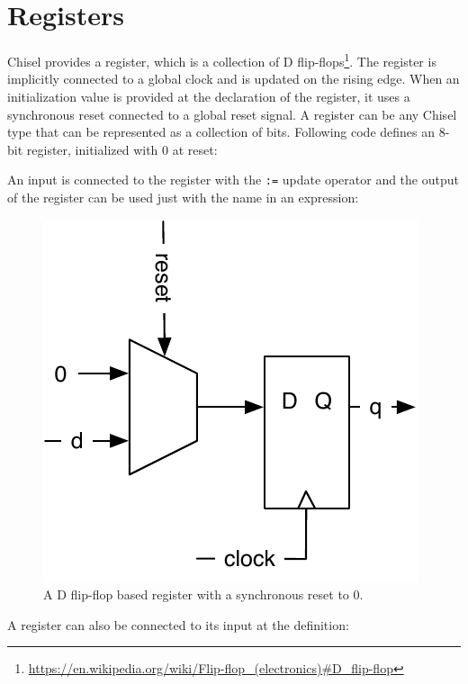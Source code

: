 \documentclass[%
    10pt,
    headinclude, footexclude,
    openright, %
    notitlepage,
    cleardoubleempty,
    headsepline,
    pointlessnumbers,
    bibtotoc, idxtotoc,
    ]{scrbook}
\newcommand{\code}[1]{{\small{\texttt{#1}}}}
\newcommand{\scale}{0.7}
\newcommand{\myref}[2]{\href{#1}{#2}}
\renewcommand{\myref}[2]{{#2}{\footnote{\url{#1}}}}
\begin{document}
\section{Registers}


Chisel provides a register, which is a collection of
\myref{https://en.wikipedia.org/wiki/Flip-flop\_(electronics)\#D\_flip-flop}{D flip-flops}.
The register is implicitly connected to a global clock and is updated on the rising edge.
When an initialization value is provided at the declaration of the register,
it uses a synchronous reset connected to a global reset signal.
A register can be any Chisel type that can be represented as a collection of bits.
Following code defines an 8-bit register, initialized with 0 at reset:


\noindent An input is connected to the register with the \code{:=} update operator and
the output of the register can be used just with the name in an expression:


\begin{figure}
  \centering
  \includegraphics[scale=\scale]{figures/register-reset-0}
  \caption{A D flip-flop based register with a synchronous reset to 0.}
  \label{fig:register-reset-0}
\end{figure}

\noindent A register can also be connected to its input at the definition:
\end{document}
